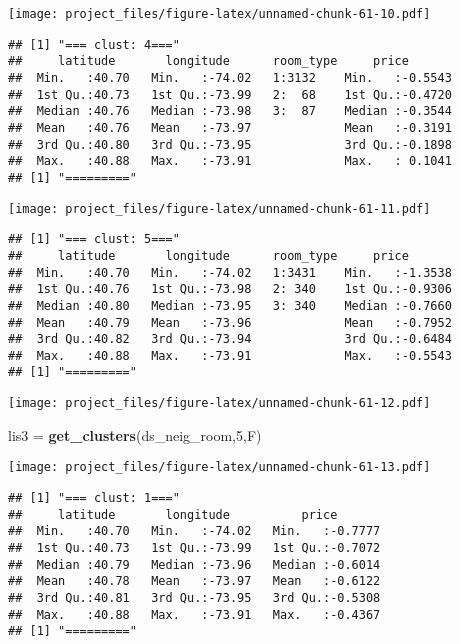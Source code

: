 \documentclass[
]{article}
\newenvironment{Shaded}{\begin{snugshade}}{\end{snugshade}}
\newcommand{\DecValTok}[1]{\textcolor[rgb]{0.00,0.00,0.81}{#1}}
\newcommand{\KeywordTok}[1]{\textcolor[rgb]{0.13,0.29,0.53}{\textbf{#1}}}
\newcommand{\NormalTok}[1]{#1}
\newcommand{\OperatorTok}[1]{\textcolor[rgb]{0.81,0.36,0.00}{\textbf{#1}}}
\newcommand{\StringTok}[1]{\textcolor[rgb]{0.31,0.60,0.02}{#1}}
\begin{document}
\texttt{[image: project\_files/figure-latex/unnamed-chunk-61-10.pdf]}

\begin{verbatim}
## [1] "=== clust: 4==="
##     latitude       longitude      room_type     price        
##  Min.   :40.70   Min.   :-74.02   1:3132    Min.   :-0.5543  
##  1st Qu.:40.73   1st Qu.:-73.99   2:  68    1st Qu.:-0.4720  
##  Median :40.76   Median :-73.98   3:  87    Median :-0.3544  
##  Mean   :40.76   Mean   :-73.97             Mean   :-0.3191  
##  3rd Qu.:40.80   3rd Qu.:-73.95             3rd Qu.:-0.1898  
##  Max.   :40.88   Max.   :-73.91             Max.   : 0.1041  
## [1] "========="
\end{verbatim}

\texttt{[image: project\_files/figure-latex/unnamed-chunk-61-11.pdf]}

\begin{verbatim}
## [1] "=== clust: 5==="
##     latitude       longitude      room_type     price        
##  Min.   :40.70   Min.   :-74.02   1:3431    Min.   :-1.3538  
##  1st Qu.:40.76   1st Qu.:-73.98   2: 340    1st Qu.:-0.9306  
##  Median :40.80   Median :-73.95   3: 340    Median :-0.7660  
##  Mean   :40.79   Mean   :-73.96             Mean   :-0.7952  
##  3rd Qu.:40.82   3rd Qu.:-73.94             3rd Qu.:-0.6484  
##  Max.   :40.88   Max.   :-73.91             Max.   :-0.5543  
## [1] "========="
\end{verbatim}

\begin{Shaded}
\end{Shaded}

\texttt{[image: project\_files/figure-latex/unnamed-chunk-61-12.pdf]}

\begin{Shaded}
\begin{Highlighting}[]
\NormalTok{lis3 =}\StringTok{ }\KeywordTok{get_clusters}\NormalTok{(ds_neig_room,}\DecValTok{5}\NormalTok{,F)}
\end{Highlighting}
\end{Shaded}

\texttt{[image: project\_files/figure-latex/unnamed-chunk-61-13.pdf]}

\begin{verbatim}
## [1] "=== clust: 1==="
##     latitude       longitude          price        
##  Min.   :40.70   Min.   :-74.02   Min.   :-0.7777  
##  1st Qu.:40.73   1st Qu.:-73.99   1st Qu.:-0.7072  
##  Median :40.79   Median :-73.96   Median :-0.6014  
##  Mean   :40.78   Mean   :-73.97   Mean   :-0.6122  
##  3rd Qu.:40.81   3rd Qu.:-73.95   3rd Qu.:-0.5308  
##  Max.   :40.88   Max.   :-73.91   Max.   :-0.4367  
## [1] "========="
\end{verbatim}
\end{document}
